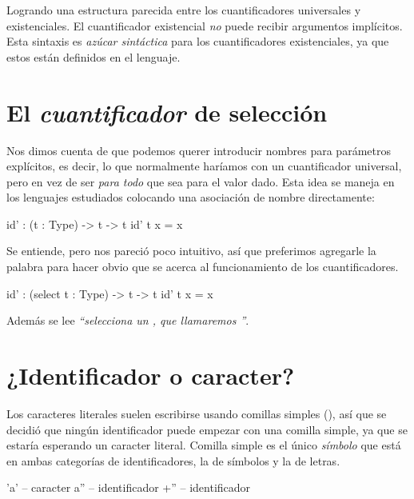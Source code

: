 {\begin{designfr}
Logrando una estructura parecida entre los cuantificadores universales y existenciales. El cuantificador existencial \emph{no} puede recibir argumentos implícitos. Esta sintaxis es \emph{azúcar sintáctica} para los cuantificadores existenciales, ya que estos están definidos en el lenguaje.
\end{designfr}

\section{El \emph{cuantificador} de selección}

\begin{designfr}
Nos dimos cuenta de que podemos querer introducir nombres para parámetros explícitos, es decir, lo que normalmente haríamos con un cuantificador universal, pero en vez de ser \emph{para todo} que sea para el valor dado. Esta idea se maneja en los lenguajes estudiados colocando una asociación de nombre directamente:

\begin{anglercode}
id' : (t : Type) -> t -> t
id' t x = x
\end{anglercode}

Se entiende, pero nos pareció poco intuitivo, así que preferimos agregarle la palabra  para hacer obvio que se acerca al funcionamiento de los cuantificadores.

\begin{anglercode}
id' : (select t : Type) -> t -> t
id' t x = x
\end{anglercode}

Además se lee \emph{\enquote{selecciona un , que llamaremos }}.
\end{designfr}

\section{¿Identificador o caracter?}

\begin{designfr}
Los caracteres literales suelen escribirse usando comillas simples (), así que se decidió que ningún identificador puede empezar con una comilla simple, ya que se estaría esperando un caracter literal. Comilla simple es el único \emph{símbolo} que está en ambas categorías de identificadores, la de símbolos y la de letras.

\begin{anglercode}
'a'     -- caracter
a''     -- identificador
+''     -- identificador
\end{anglercode}
\end{designfr}


}
